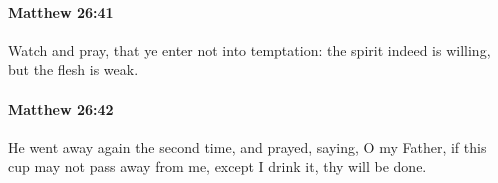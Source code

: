 		\paragraph{Matthew 26:41} %
			\label{MATTHEW-26-41}

			Watch and pray, that ye enter not into temptation: the spirit indeed is willing, but the flesh is weak.

			\begin{framed}
			\scriptsize
				\begin{compactdesc}
					\item[SBLG] 
				\end{compactdesc}
			\end{framed}

		\paragraph{Matthew 26:42} %
			\label{MATTHEW-26-42}

			He went away again the second time, and prayed, saying, O my Father, if this cup may not pass away from me, except I drink it, thy will be done.

